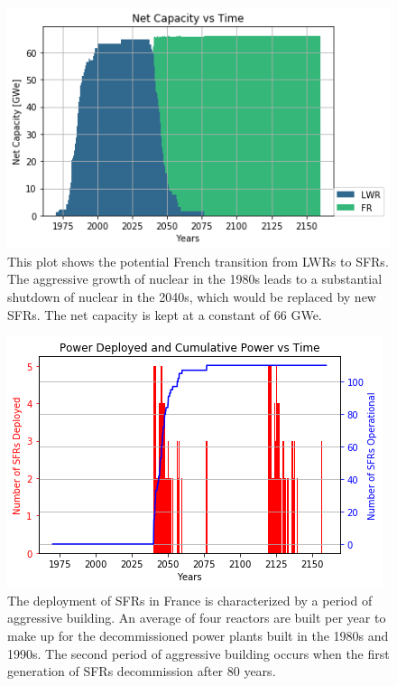\begin{figure}[htbp!]
        \begin{center}
                \includegraphics[scale=0.6]{./images/french-transition/power_plot.png}
        \end{center}
        \caption{This plot shows the potential French transition from \glspl{LWR} to \glspl{SFR}.
                 The aggressive growth of nuclear in the 1980s leads to a substantial shutdown
                 of nuclear in the 2040s, which would be replaced by new \glspl{SFR}. The net
                 capacity is kept at a constant of 66 GWe.}
        \label{fig:sfr_num}
\end{figure}
\begin{figure}[htbp!]
    \begin{center}
        \includegraphics[scale=0.6]{./images/french-transition/sfr_deploy.png}
    \end{center}
    \caption{The deployment of \glspl{SFR} in France is characterized by a period of
             aggressive building. An average of four reactors are built per year to
             make up for the decommissioned power plants built in the 1980s and 1990s.
             The second period of aggressive building occurs when the first generation
             of \glspl{SFR} decommission after 80 years.}
    \label{fig:dep}
\end{figure}

